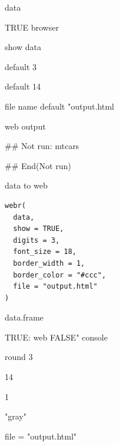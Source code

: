 \documentclass[a4paper]{book}
\begin{document}
%
\begin{Arguments}
\begin{ldescription}
\item[\code{data}] data

\item[\code{out}] TRUE browser

\item[\code{tibble}] show data

\item[\code{digits}] default 3

\item[\code{font\_size}] default 14

\item[\code{file}] file name default "output.html
\end{ldescription}
\end{Arguments}
%
\begin{Value}
web output
\end{Value}
%
\begin{Examples}
\begin{ExampleCode}

\#\# Not run: 
mtcars%


## End(Not run)

\end{ExampleCode}
\end{Examples}
%
\begin{Description}
data to web
\end{Description}
%
\begin{Usage}
\begin{verbatim}
webr(
  data,
  show = TRUE,
  digits = 3,
  font_size = 18,
  border_width = 1,
  border_color = "#ccc",
  file = "output.html"
)
\end{verbatim}
\end{Usage}
%
\begin{Arguments}
\begin{ldescription}
\item[\code{data}] data.frame

\item[\code{show}] TRUE: web FALSE" console

\item[\code{digits}] round 3

\item[\code{font\_size}] 14

\item[\code{border\_width}] 1

\item[\code{border\_color}] "gray"

\item[\code{file}] file = "output.html"
\end{ldescription}
\end{Arguments}
\end{document}
